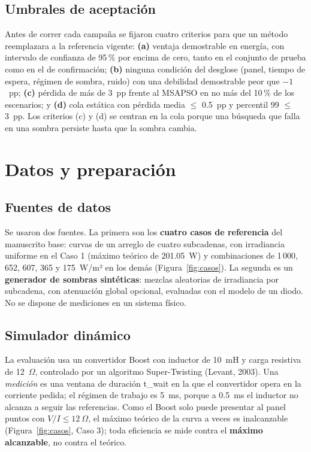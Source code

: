 \documentclass[letterpaper,11pt]{article}
\begin{document}
\subsection{Umbrales de aceptación}
Antes de correr cada campaña se fijaron cuatro criterios para que un método reemplazara a la referencia vigente: \textbf{(a)} ventaja demostrable en energía, con intervalo de confianza de 95\,\% por encima de cero, tanto en el conjunto de prueba como en el de confirmación; \textbf{(b)} ninguna condición del desglose (panel, tiempo de espera, régimen de sombra, ruido) con una debilidad demostrable peor que $-1$~pp; \textbf{(c)} pérdida de más de 3~pp frente al MSAPSO en no más del 10\,\% de los escenarios; y \textbf{(d)} cola estática con pérdida media $\leq$ 0.5~pp y percentil 99 $\leq$ 3~pp. Los criterios (c) y (d) se centran en la cola porque una búsqueda que falla en una sombra persiste hasta que la sombra cambia.

\section{Datos y preparación}

\subsection{Fuentes de datos}
Se usaron dos fuentes. La primera son los \textbf{cuatro casos de referencia} del manuscrito base: curvas de un arreglo de cuatro subcadenas, con irradiancia uniforme en el Caso 1 (máximo teórico de 201.05~W) y combinaciones de 1\,000, 652, 607, 365 y 175~W/m² en los demás (Figura~\ref{fig:casos}). La segunda es un \textbf{generador de sombras sintéticas}: mezclas aleatorias de irradiancia por subcadena, con atenuación global opcional, evaluadas con el modelo de un diodo. No se dispone de mediciones en un sistema físico.

\subsection{Simulador dinámico}
La evaluación usa un convertidor Boost con inductor de 10~mH y carga resistiva de 12~$\Omega$, controlado por un algoritmo Super-Twisting (Levant, 2003). Una \textit{medición} es una ventana de duración t\_wait en la que el convertidor opera en la corriente pedida; el régimen de trabajo es 5~ms, porque a 0.5~ms el inductor no alcanza a seguir las referencias. Como el Boost solo puede presentar al panel puntos con $V/I \leq 12~\Omega$, el máximo teórico de la curva a veces es inalcanzable (Figura~\ref{fig:casos}, Caso 3); toda eficiencia se mide contra el \textbf{máximo alcanzable}, no contra el teórico.
\end{document}
